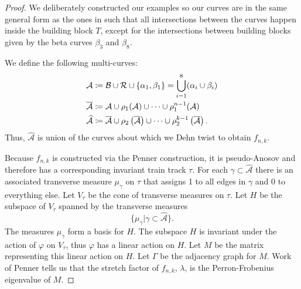 \begin{proof}
 We deliberately constructed our examples so our curves are in the same general form as the ones in
 \cite{yazdi2018pseudo} such that all intersections between the curves happen inside the building block $T$, except for the intersections between building blocks given by the beta curves $\beta_3$ and $\beta_8$. %

  We define the following multi-curves:
\begin{align*}
  \mathcal{A} &\coloneqq \mathcal{B} \cup \mathcal{R} \cup \{\alpha_1,\beta_1\} =\bigcup_{i=1}^8(\alpha_i\cup\beta_i)\\
  \smallskip
  \overline{\mathcal{A}} &\coloneqq \mathcal{A} \cup \rho_1(\mathcal{A}) \cup \dots \cup \rho_1^{n-1}(\mathcal{A}) \\
  \widehat{\mathcal{A}} &\coloneqq \overline{\mathcal{A}} \cup \rho_2\left(\overline{\mathcal{A}}\right) \cup \dots \cup \rho_2^{k-1}\left(\overline{\mathcal{A}}\right).
\end{align*}
Thus, $\widehat{\mathcal{A}}$ is union of the curves about which we Dehn twist to obtain $f_{n,k}$.

Because $f_{n,k}$ is constructed via the Penner construction, it is pseudo-Anosov and therefore has a corresponding invariant train track $\tau$.  For each $\gamma\subset\widehat{\mathcal{A}}$ there is an associated transverse measure $\mu_\gamma$ on $\tau$ that assigns 1 to all edges in $\gamma$ and 0 to everything else. Let $V_\tau$ be the cone of transverse measures on $\tau$.  Let $H$ be the subspace of $V_\tau$ spanned by the transverse measures $$\{\mu_\gamma | \gamma\subset\widehat{\mathcal{A}}\}.$$
The measures $\mu_\gamma$ form a basis for $H$.  The subspace $H$ is invariant under the action of $\varphi$ on $V_\tau$, thus $\varphi$ has a linear action on $H$. Let $M$
be the matrix representing this linear action on $H$.  Let $\Gamma$ be the adjacency graph for $M$. Work of Penner \cite{penner1988construction} tells us that the stretch factor of $f_{n,k}$, $\lambda$, is the Perron-Frobenius eigenvalue of $M$.


\end{proof}
